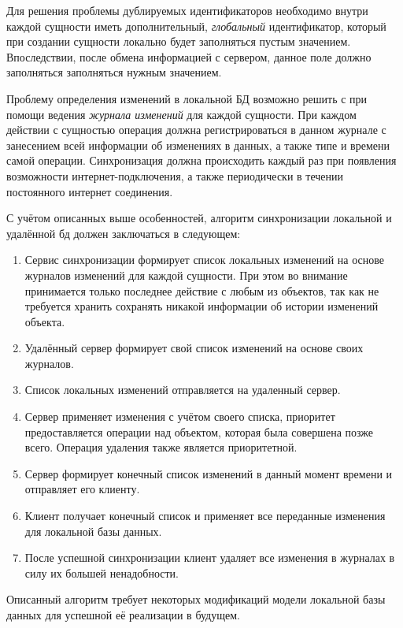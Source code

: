 Для решения проблемы дублируемых идентификаторов необходимо внутри каждой сущности иметь дополнительный, \emph{глобальный} идентификатор, который при создании сущности локально будет заполняться пустым значением.
Впоследствии, после обмена информацией с сервером, данное поле должно заполняться заполняться нужным значением.

Проблему определения изменений в локальной БД возможно решить с при помощи ведения \emph{журнала изменений} для каждой сущности.
При каждом действии с сущностью операция должна регистрироваться в данном журнале с занесением всей информации об изменениях в данных, а также типе и времени самой операции.
Синхронизация должна происходить каждый раз при появления возможности интернет-подключения, а также периодически в течении постоянного интернет соединения.

С учётом описанных выше особенностей, алгоритм синхронизации локальной и удалённой бд должен заключаться в следующем:
\begin{enumerate}
    \item Сервис синхронизации формирует список локальных изменений на основе журналов изменений для каждой сущности.
    При этом во внимание принимается только последнее действие с любым из объектов, так как не требуется хранить сохранять никакой информации об истории изменений объекта.
    \item Удалённый сервер формирует свой список изменений на основе своих журналов.
    \item Список локальных изменений отправляется на удаленный сервер.
    \item Сервер применяет изменения с учётом своего списка, приоритет предоставляется операции над объектом, которая была совершена позже всего.
    Операция удаления также является приоритетной.
    \item Сервер формирует конечный список изменений в данный момент времени и отправляет его клиенту.
    \item Клиент получает конечный список и применяет все переданные изменения для локальной базы данных.
    \item После успешной синхронизации клиент удаляет все изменения в журналах в силу их большей ненадобности.
\end{enumerate}

Описанный алгоритм требует некоторых модификаций модели локальной базы данных для успешной её реализации в будущем.